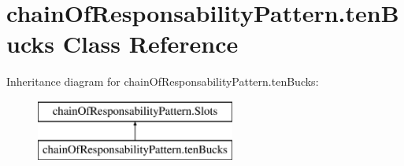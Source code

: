 \hypertarget{classchain_of_responsability_pattern_1_1ten_bucks}{}\section{chain\+Of\+Responsability\+Pattern.\+ten\+Bucks Class Reference}
\label{classchain_of_responsability_pattern_1_1ten_bucks}
Inheritance diagram for chain\+Of\+Responsability\+Pattern.\+ten\+Bucks\+:\begin{figure}[H]
\begin{center}
\leavevmode
\includegraphics[height=2.000000cm]{classchain_of_responsability_pattern_1_1ten_bucks}
\end{center}
\end{figure}
